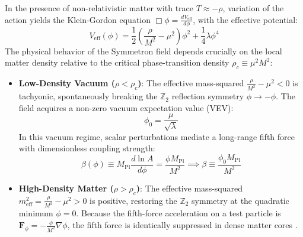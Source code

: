 \documentclass[11pt,a4paper]{article}
\begin{document}
In the presence of non-relativistic matter with trace $T \approx -\rho$, variation of the action yields the Klein-Gordon equation $\Box \phi = \frac{dV_{\text{eff}}}{d\phi}$, with the effective potential:
\begin{equation}
V_{\text{eff}}(\phi) = \frac{1}{2}\left(\frac{\rho}{M^2} - \mu^2\right)\phi^2 + \frac{1}{4}\lambda \phi^4
\end{equation}
The physical behavior of the Symmetron field depends crucially on the local matter density relative to the critical phase-transition density $\rho_c \equiv \mu^2 M^2$:
\begin{itemize}
    \item \textbf{Low-Density Vacuum ($\rho < \rho_c$)}: The effective mass-squared $\frac{\rho}{M^2} - \mu^2 < 0$ is tachyonic, spontaneously breaking the $\mathbb{Z}_2$ reflection symmetry $\phi \to -\phi$. The field acquires a non-zero vacuum expectation value (VEV):
    \begin{equation}
    \phi_0 = \frac{\mu}{\sqrt{\lambda}}
    \end{equation}
    In this vacuum regime, scalar perturbations mediate a long-range fifth force with dimensionless coupling strength:
    \begin{equation}
    \beta(\phi) \equiv M_{\text{Pl}} \frac{d \ln A}{d\phi} = \frac{\phi M_{\text{Pl}}}{M^2} \implies \beta \equiv \frac{\phi_0 M_{\text{Pl}}}{M^2}
    \end{equation}
    \item \textbf{High-Density Matter ($\rho > \rho_c$)}: The effective mass-squared $m_{\text{eff}}^2 = \frac{\rho}{M^2} - \mu^2 > 0$ is positive, restoring the $\mathbb{Z}_2$ symmetry at the quadratic minimum $\phi = 0$. Because the fifth-force acceleration on a test particle is $\mathbf{F}_\phi = -\frac{\phi}{M^2}\nabla\phi$, the fifth force is identically suppressed in dense matter cores \cite{hinterbichler2010}.
\end{itemize}
\end{document}

